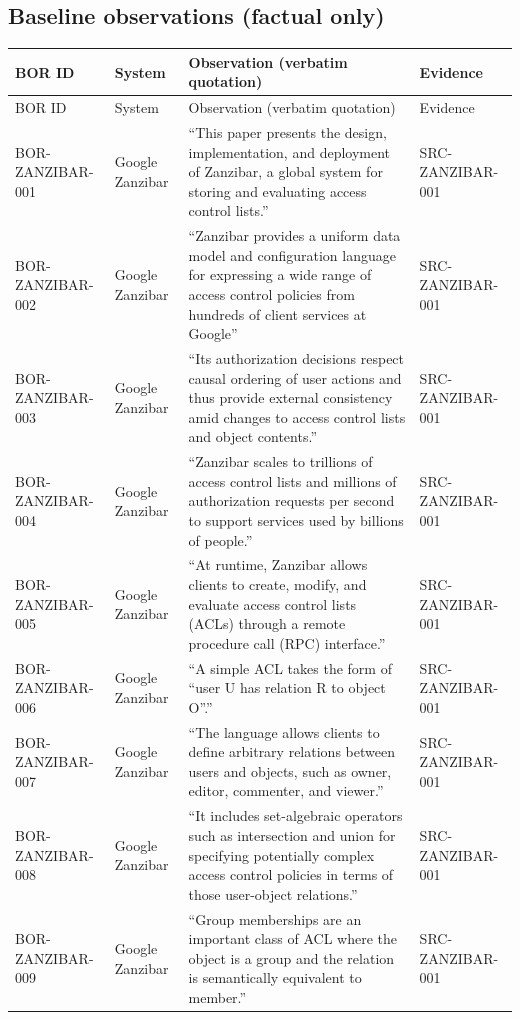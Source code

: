 \documentclass{article}
\begin{document}
\subsection*{Baseline observations (factual only)}
\begin{longtable}{@{}p{}p{}p{}p{}@{}}
\toprule
BOR ID & System & Observation (verbatim quotation) & Evidence\\
\midrule
\endfirsthead
\toprule
BOR ID & System & Observation (verbatim quotation) & Evidence\\
\midrule
\endhead
BOR-ZANZIBAR-001 & Google Zanzibar & ``This paper presents the design, implementation, and deployment of Zanzibar, a global system for storing and evaluating access control lists.'' & SRC-ZANZIBAR-001\\
BOR-ZANZIBAR-002 & Google Zanzibar & ``Zanzibar provides a uniform data model and configuration language for expressing a wide range of access control policies from hundreds of client services at Google'' & SRC-ZANZIBAR-001\\
BOR-ZANZIBAR-003 & Google Zanzibar & ``Its authorization decisions respect causal ordering of user actions and thus provide external consistency amid changes to access control lists and object contents.'' & SRC-ZANZIBAR-001\\
BOR-ZANZIBAR-004 & Google Zanzibar & ``Zanzibar scales to trillions of access control lists and millions of authorization requests per second to support services used by billions of people.'' & SRC-ZANZIBAR-001\\
BOR-ZANZIBAR-005 & Google Zanzibar & ``At runtime, Zanzibar allows clients to create, modify, and evaluate access control lists (ACLs) through a remote procedure call (RPC) interface.'' & SRC-ZANZIBAR-001\\
BOR-ZANZIBAR-006 & Google Zanzibar & ``A simple ACL takes the form of “user U has relation R to object O”.'' & SRC-ZANZIBAR-001\\
BOR-ZANZIBAR-007 & Google Zanzibar & ``The language allows clients to define arbitrary relations between users and objects, such as owner, editor, commenter, and viewer.'' & SRC-ZANZIBAR-001\\
BOR-ZANZIBAR-008 & Google Zanzibar & ``It includes set-algebraic operators such as intersection and union for specifying potentially complex access control policies in terms of those user-object relations.'' & SRC-ZANZIBAR-001\\
BOR-ZANZIBAR-009 & Google Zanzibar & ``Group memberships are an important class of ACL where the object is a group and the relation is semantically equivalent to member.'' & SRC-ZANZIBAR-001\\
\bottomrule
\end{longtable}
\end{document}
